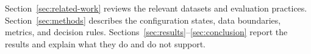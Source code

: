 Section~\ref{sec:related-work} reviews the relevant datasets and evaluation practices.  Section~\ref{sec:methods} describes the configuration states, data boundaries, metrics, and decision rules.  Sections~\ref{sec:results}--\ref{sec:conclusion} report the results and explain what they do and do not support.
